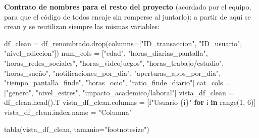 \documentclass[11pt,spanish,a4paper,]{article}
\newenvironment{Shaded}{\begin{snugshade}}{\end{snugshade}}
\newcommand{\BuiltInTok}[1]{\textcolor[rgb]{0.00,0.23,0.31}{#1}}
\newcommand{\ControlFlowTok}[1]{\textcolor[rgb]{0.00,0.23,0.31}{\textbf{#1}}}
\newcommand{\DecValTok}[1]{\textcolor[rgb]{0.68,0.00,0.00}{#1}}
\newcommand{\KeywordTok}[1]{\textcolor[rgb]{0.00,0.23,0.31}{\textbf{#1}}}
\newcommand{\NormalTok}[1]{\textcolor[rgb]{0.00,0.23,0.31}{#1}}
\newcommand{\OperatorTok}[1]{\textcolor[rgb]{0.37,0.37,0.37}{#1}}
\newcommand{\SpecialCharTok}[1]{\textcolor[rgb]{0.37,0.37,0.37}{#1}}
\newcommand{\SpecialStringTok}[1]{\textcolor[rgb]{0.13,0.47,0.30}{#1}}
\newcommand{\StringTok}[1]{\textcolor[rgb]{0.13,0.47,0.30}{#1}}
\begin{document}
\textbf{Contrato de nombres para el resto del proyecto} (acordado por el
equipo, para que el código de todos encaje sin romperse al juntarlo): a
partir de aquí se crean y se reutilizan siempre las mismas variables:

\begin{Shaded}
\begin{Highlighting}[]
\NormalTok{df\_clean }\OperatorTok{=}\NormalTok{ df\_renombrado.drop(columns}\OperatorTok{=}\NormalTok{[}\StringTok{"ID\_transaccion"}\NormalTok{, }\StringTok{"ID\_usuario"}\NormalTok{, }\StringTok{"nivel\_adiccion"}\NormalTok{])}
\NormalTok{num\_cols }\OperatorTok{=}\NormalTok{ [}\StringTok{"edad"}\NormalTok{, }\StringTok{"horas\_diarias\_pantalla"}\NormalTok{, }\StringTok{"horas\_redes\_sociales"}\NormalTok{,}
\StringTok{"horas\_videojuegos"}\NormalTok{, }\StringTok{"horas\_trabajo/estudio"}\NormalTok{, }\StringTok{"horas\_sueño"}\NormalTok{, }\StringTok{"notificaciones\_por\_dia"}\NormalTok{,}
\StringTok{"aperturas\_apps\_por\_dia"}\NormalTok{, }\StringTok{"tiempo\_pantalla\_finde"}\NormalTok{, }\StringTok{"horas\_ocio"}\NormalTok{, }\StringTok{"ratio\_finde\_diario"}\NormalTok{]}
\NormalTok{cat\_cols }\OperatorTok{=}\NormalTok{ [}\StringTok{"genero"}\NormalTok{, }\StringTok{"nivel\_estres"}\NormalTok{, }\StringTok{"impacto\_academico/laboral"}\NormalTok{]}
\NormalTok{vista\_df\_clean }\OperatorTok{=}\NormalTok{ df\_clean.head().T}
\NormalTok{vista\_df\_clean.columns }\OperatorTok{=}\NormalTok{ [}\SpecialStringTok{f"Usuario }\SpecialCharTok{\{}\NormalTok{i}\SpecialCharTok{\}}\SpecialStringTok{"} \ControlFlowTok{for}\NormalTok{ i }\KeywordTok{in} \BuiltInTok{range}\NormalTok{(}\DecValTok{1}\NormalTok{, }\DecValTok{6}\NormalTok{)]}
\NormalTok{vista\_df\_clean.index.name }\OperatorTok{=} \StringTok{"Columna"}

\NormalTok{tabla(vista\_df\_clean, tamanio}\OperatorTok{=}\StringTok{"footnotesize"}\NormalTok{)}
\end{Highlighting}
\end{Shaded}
\end{document}
